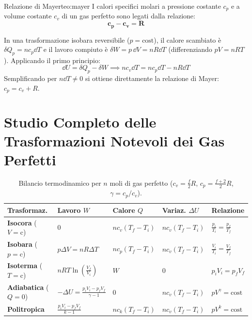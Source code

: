 \begin{teorema}{Relazione di Mayer}{teo:mayer}
I calori specifici molari a pressione costante $c_p$ e a volume costante $c_v$ di un gas perfetto sono legati dalla relazione:
\begin{equation}
    \mathbf{c_p - c_v = R}
    \label{eq:relazione_mayer}
\end{equation}
\end{teorema}

\begin{dimostrazione}
In una trasformazione isobara reversibile ($p = \text{cost}$), il calore scambiato è $\delta Q_p = n c_p \dd T$ e il lavoro compiuto è $\delta W = p\,\dd V = n R \dd T$ (differenziando $p V = n R T$).
Applicando il primo principio:
\begin{equation}
    \dd U = \delta Q_p - \delta W \implies n c_v \dd T = n c_p \dd T - n R \dd T
\end{equation}
Semplificando per $n \dd T \neq 0$ si ottiene direttamente la relazione di Mayer: $c_p = c_v + R$.
\end{dimostrazione}

\section{Studio Completo delle Trasformazioni Notevoli dei Gas Perfetti}
\label{sec:trasformazioni_notevoli}

\begin{table}[htbp]
\centering
\caption{Bilancio termodinamico per $n$ moli di gas perfetto ($c_v = \frac{f}{2}R$, $c_p = \frac{f+2}{2}R$, $\gamma = c_p/c_v$).}
\label{tab:trasformazioni_notevoli}
\begin{tabularx}{\textwidth}{p{2.6cm} p{2.8cm} p{3.2cm} p{3.0cm} X}
\toprule
\textbf{Trasformaz.} & \textbf{Lavoro $W$} & \textbf{Calore $Q$} & \textbf{Variaz. $\Delta U$} & \textbf{Relazione} \\
\midrule
\textbf{Isocora} ($V=\text{c}$) & $0$ & $n c_v (T_f - T_i)$ & $n c_v (T_f - T_i)$ & $\frac{p_i}{T_i} = \frac{p_f}{T_f}$ \\
\textbf{Isobara} ($p=\text{c}$) & $p\Delta V = n R\Delta T$ & $n c_p (T_f - T_i)$ & $n c_v (T_f - T_i)$ & $\frac{V_i}{T_i} = \frac{V_f}{T_f}$ \\
\textbf{Isoterma} ($T=\text{c}$) & $n R T \ln\left(\frac{V_f}{V_i}\right)$ & $W$ & $0$ & $p_i V_i = p_f V_f$ \\
\textbf{Adiabatica} ($Q=0$) & $-\Delta U = \frac{p_i V_i - p_f V_f}{\gamma - 1}$ & $0$ & $n c_v (T_f - T_i)$ & $p V^\gamma = \text{cost}$ \\
\textbf{Politropica} & $\frac{p_i V_i - p_f V_f}{k - 1}$ & $n c_k (T_f - T_i)$ & $n c_v (T_f - T_i)$ & $p V^k = \text{cost}$ \\
\bottomrule
\end{tabularx}
\end{table}


